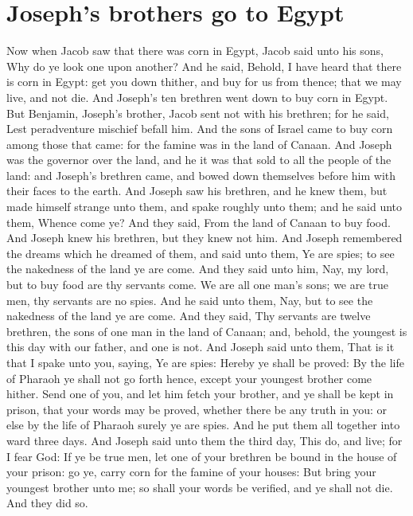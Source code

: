 \section*{Joseph's brothers go to Egypt}
\begin{biblechapter} %
\verse Now when Jacob saw that there was corn in Egypt, Jacob said unto his sons, Why do ye look one upon another?
\verse And he said, Behold, I have heard that there is corn in Egypt: get you down thither, and buy for us from thence; that we may live, and not die.
\verse And Joseph's ten brethren went down to buy corn in Egypt.
\verse But Benjamin, Joseph's brother, Jacob sent not with his brethren; for he said, Lest peradventure mischief befall him.
\verse And the sons of Israel came to buy corn among those that came: for the famine was in the land of Canaan.
\verse And Joseph was the governor over the land, and he it was that sold to all the people of the land: and Joseph's brethren came, and bowed down themselves before him with their faces to the earth.
\verse And Joseph saw his brethren, and he knew them, but made himself strange unto them, and spake roughly unto them; and he said unto them, Whence come ye? And they said, From the land of Canaan to buy food.
\verse And Joseph knew his brethren, but they knew not him.
\verse And Joseph remembered the dreams which he dreamed of them, and said unto them, Ye are spies; to see the nakedness of the land ye are come.
\verse And they said unto him, Nay, my lord, but to buy food are thy servants come.
\verse We are all one man's sons; we are true men, thy servants are no spies.
\verse And he said unto them, Nay, but to see the nakedness of the land ye are come.
\verse And they said, Thy servants are twelve brethren, the sons of one man in the land of Canaan; and, behold, the youngest is this day with our father, and one is not.
\verse And Joseph said unto them, That is it that I spake unto you, saying, Ye are spies:
\verse Hereby ye shall be proved: By the life of Pharaoh ye shall not go forth hence, except your youngest brother come hither.
\verse Send one of you, and let him fetch your brother, and ye shall be kept in prison, that your words may be proved, whether there be any truth in you: or else by the life of Pharaoh surely ye are spies.
\verse And he put them all together into ward three days.
\verse And Joseph said unto them the third day, This do, and live; for I fear God:
\verse If ye be true men, let one of your brethren be bound in the house of your prison: go ye, carry corn for the famine of your houses:
\verse But bring your youngest brother unto me; so shall your words be verified, and ye shall not die. And they did so.

\end{biblechapter}
